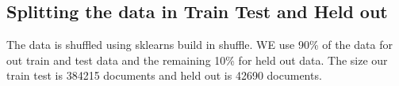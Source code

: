 \subsection{Splitting the data in Train Test and Held out} \label{methodology:traintestheldout}
The data is shuffled using sklearns build in shuffle. WE use 90\% of the data for out train and test data and the remaining 10\% for held out data. The size our train test is 384215 documents and held out is 42690 documents.

